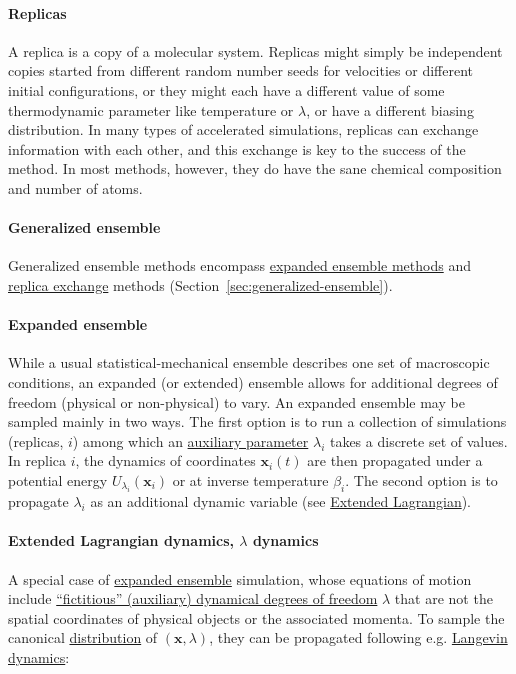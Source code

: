 \documentclass[9pt,review]{livecoms}
\newcommand{\vx}{\mathbf{x}}
\begin{document}
\hypertarget{ref:Replica} {\paragraph{Replicas}}
A replica is a copy of a molecular system. Replicas might simply be independent copies started from different random number seeds for velocities or different initial configurations, or they might each have a different value of some thermodynamic parameter like temperature or $\lambda$, or have a different biasing distribution. In many types of accelerated simulations, replicas can exchange information with each other, and this exchange is key to the success of the method.  In most methods, however, they do have the sane chemical composition and number of atoms. 

\hypertarget{ref:GenEns} {\paragraph{Generalized ensemble}}
Generalized ensemble methods encompass \hyperlink{ref:ExpEns} {expanded ensemble methods} and \hyperlink{ref:ReplEx} {replica exchange} methods (Section~\ref{sec:generalized-ensemble}).

\hypertarget{ref:ExpEns} {\paragraph{Expanded ensemble}}
While a usual statistical-mechanical ensemble describes one set of macroscopic conditions, an expanded (or extended) ensemble allows for additional degrees of freedom (physical or non-physical) to vary.  An expanded ensemble may be sampled mainly in two ways. The first option is to run a collection of simulations (replicas, $i$) among which an \hyperlink{ref:AuxVar} {auxiliary parameter} $\lambda_i$ takes a discrete set of values. In replica $i$, the dynamics of coordinates $\vx_i(t)$ are then propagated under a potential energy $U_{\lambda_i}(\vx_i)$ or at inverse temperature $\beta_i$.
The second option is to propagate $\lambda_i$ as an additional dynamic variable (see \hyperlink{ref:ExtL} {Extended Lagrangian}).

\hypertarget{ref:ExtL}{\paragraph{Extended Lagrangian dynamics, $\lambda$ dynamics}}
A special case of \hyperlink{ref:ExpEns} {expanded ensemble} simulation, whose equations of motion include \hyperlink{ref:AuxVar} {``fictitious'' (auxiliary) dynamical degrees of freedom} $\lambda$ that are not the spatial coordinates of physical objects or the associated momenta.
To sample the canonical \hyperlink{ref:Distribution} {distribution} of $(\vx, \lambda)$, they can be propagated following e.g. \hyperlink{ref:Langevin} {Langevin dynamics}:
\end{document}
